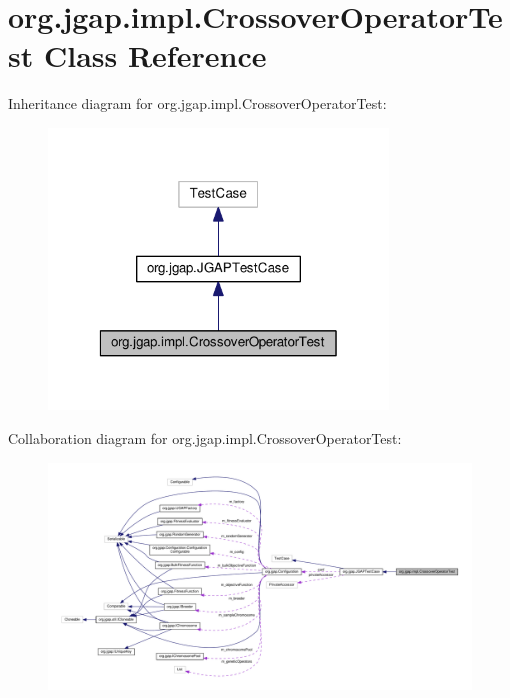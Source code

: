 \hypertarget{classorg_1_1jgap_1_1impl_1_1_crossover_operator_test}{\section{org.\-jgap.\-impl.\-Crossover\-Operator\-Test Class Reference}
\label{classorg_1_1jgap_1_1impl_1_1_crossover_operator_test}
}


Inheritance diagram for org.\-jgap.\-impl.\-Crossover\-Operator\-Test\-:
\nopagebreak
\begin{figure}[H]
\begin{center}
\leavevmode
\includegraphics[width=256pt]{classorg_1_1jgap_1_1impl_1_1_crossover_operator_test__inherit__graph}
\end{center}
\end{figure}


Collaboration diagram for org.\-jgap.\-impl.\-Crossover\-Operator\-Test\-:
\nopagebreak
\begin{figure}[H]
\begin{center}
\leavevmode
\includegraphics[width=350pt]{classorg_1_1jgap_1_1impl_1_1_crossover_operator_test__coll__graph}
\end{center}
\end{figure}
